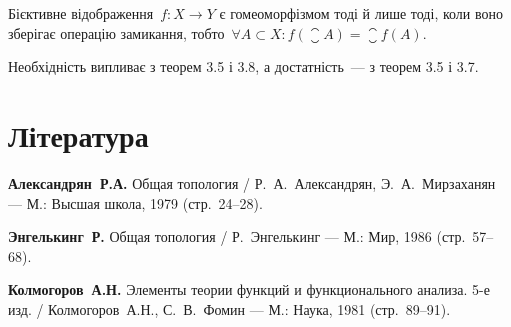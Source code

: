 \begin{theorem}
    Бієктивне відображення~$f: X \to Y$ є гомеоморфізмом тоді й лише тоді, коли воно зберігає операцію замикання, тобто~$\forall A \subset X: f(\closure{A}) = \closure{f(A)}$.
\end{theorem}

Необхідність випливає з \error теорем 3.5 і 3.8, а достатність~--- з \error теорем 3.5 і 3.7.

\section{Література}

\begin{enumerate}[label={[\arabic*]}]
\item \textbf{Александрян~Р.А.}
Общая топология /
Р.~А.~Александрян, Э.~А.~Мирзаханян ---
М.: Высшая школа, 1979 (стр.~24--28).
\item \textbf{Энгелькинг~Р.}
Общая топология /
Р.~Энгелькинг ---
М.: Мир, 1986 (стр.~57--68).
\item \textbf{Колмогоров~А.Н.}
Элементы теории функций и функционального анализа. 5-е изд. /
Колмогоров~А.Н., С.~В.~Фомин ---
М.: Наука, 1981 (стр.~89--91).
\end{enumerate}